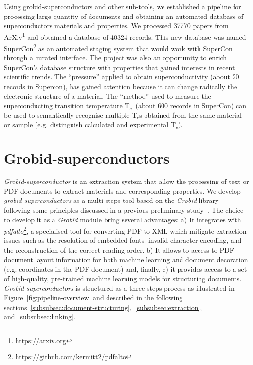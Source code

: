 \documentclass{article}
\newcommand{\tc}{T$_{c}$}
\begin{document}
Using grobid-superconductors and other sub-tools, we established a pipeline for processing large quantity of documents and obtaining an automated database of superconductors materials and properties. 
We processed 37770 papers from ArXiv\footnote{\url{https://arxiv.org}} and obtained a database of 40324 records. 
This new database was named SuperCon\textsuperscript{2} as an automated staging system that would work with SuperCon through a curated interface. 
The project was also an opportunity to enrich SuperCon's database structure with properties that gained interests in recent scientific trends. 
The ``pressure'' applied to obtain superconductivity (about 20 records in Supercon), has gained attention because it can change radically the electronic structure of a material.
The ``method'' used to measure the superconducting transition temperature \tc~(about 600 records in SuperCon) can be used to semantically recognise multiple \tc s obtained from the same material or sample (e.g. distinguish calculated and experimental \tc). 


\section{Grobid-superconductors}

\textit{Grobid-superconductor} is an extraction system that allow the processing of text or PDF documents to extract materials and corresponding properties. 
We develop \textit{grobid-superconductors} as a multi-steps tool based on the \textit{Grobid} library~\cite{GROBID} following some principles discussed in a previous preliminary study~\cite{foppiano:hal-02870896}.  
The choice to develop it as a \textit{Grobid} module bring several advantages: a) It integrates with \textit{pdfalto}\footnote{\url{https://github.com/kermitt2/pdfalto}}, a specialised tool for converting PDF to XML which mitigate extraction issues such as the resolution of embedded fonts, invalid character encoding, and the reconstruction of the correct reading order. 
b) It allows to access to PDF document layout information for both machine learning and document decoration (e.g. coordinates in the PDF document) and, finally, c) it provides access to a set of high-quality, pre-trained machine learning models for structuring documents.
\textit{Grobid-superconductors} is structured as a three-steps process as illustrated in Figure~\ref{fig:pipeline-overview} and described in the following sections~\ref{subsubsec:document-structuring},~\ref{subsubsec:extraction}, and~\ref{subsubsec:linking}.
\end{document}
